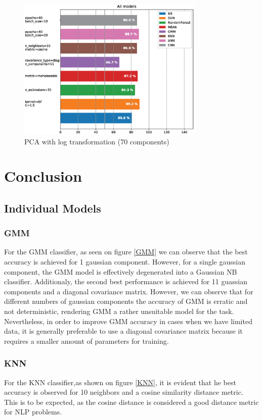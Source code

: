 \documentclass[10pt,journal,compsoc]{IEEEtran}
\begin{document}
\begin{figure}[!h]
	\centering
	\includegraphics[width=3.5in]{./img/all_models_pca_70_log.eps}
	\caption{PCA with log transformation (70 components)}
	\label{PCAlog}
\end{figure}

\section{Conclusion}
\subsection{Individual Models}
\subsubsection{GMM}
For the GMM classifier, as seen on figure 
\ref{GMM} we can observe that the 
best accuracy  is achieved for 1 
gaussian component.
However, for a single gaussian component,
the GMM model is effectively degenerated
into a Gaussian NB classifier.
Additionaly, the second best performance
is achieved for 11 guassian components
and a diagonal covariance matrix.
However, we can observe that for different
numbers of gaussian components the accuracy
of GMM is erratic and not deterministic,
rendering GMM a rather unsuitable model
for the task.
Nevertheless, in order to improve GMM accuracy 
in cases when we have limited data, 
it is generally preferable to use a
diagonal covariance matrix because it requires 
a smaller amount of parameters
for training.

\subsubsection{KNN}
For the KNN classifier,as shown on figure \ref{KNN}, 
it is evident that he best accuracy is observed 
for 10 neighbors and a cosine similarity 
distance metric.
This is to be expected, as the cosine distance
is considered a good distance metric for NLP
problems.
\end{document}

